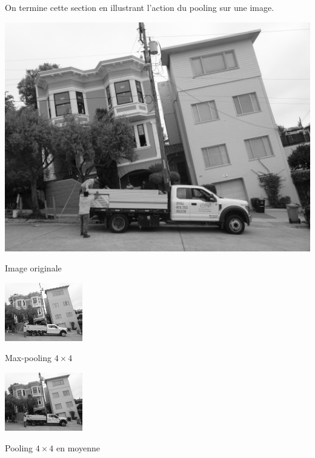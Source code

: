 \documentclass[11pt,class=report,crop=false]{standalone}
\begin{document}
On termine cette section en illustrant l'action du pooling sur une image.

\begin{center}
	\begin{minipage}{0.45\textwidth}\center
       \includegraphics[scale=\myscale,scale=0.4]{figures/image_pooling_avant}
	
	Image originale
	\end{minipage}
	\begin{minipage}{0.2\textwidth}\center
	 \includegraphics[scale=\myscale,scale=0.4]{figures/image_pooling_max}
	
	Max-pooling $4\times 4$
    \end{minipage}
	\begin{minipage}{0.2\textwidth}\center
	 \includegraphics[scale=\myscale,scale=0.4]{figures/image_pooling_average}
	
	Pooling $4\times 4$ en moyenne
    \end{minipage}    
\end{center}
\end{document}

